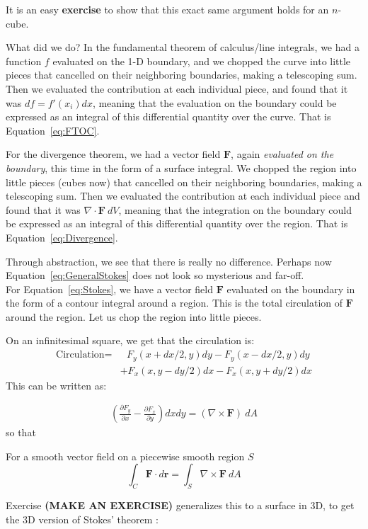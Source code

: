 	It is an easy \textbf{exercise} to show that this exact same argument holds for an $n$-cube. 
	
	What did we do? In the fundamental theorem of calculus/line integrals, we had a function $f$ evaluated on the 1-D boundary, and we chopped the curve into little pieces that cancelled on their neighboring boundaries, making a telescoping sum. Then we evaluated the contribution at each individual piece, and found that it was $df = f'(x_i) dx$, meaning that the evaluation on the boundary could be expressed as an integral of this differential quantity over the curve. That is Equation~\eqref{eq:FTOC}.
	
	For the divergence theorem, we had a vector field $\mathbf F$, again \emph{evaluated on the boundary}, this time in the form of a surface integral. We chopped the region into little pieces (cubes now) that cancelled on their neighboring boundaries, making a telescoping sum. Then we evaluated the contribution at each individual piece and found that it was $\nabla \cdot \mathbf F ~ dV$, meaning that the integration on the boundary could  be expressed as an integral of this differential quantity over the region. That is Equation~\eqref{eq:Divergence}.
	
	
	Through abstraction, we see that there is really no difference. Perhaps now Equation~\eqref{eq:GeneralStokes} does not look so mysterious and far-off.\\
	
	For Equation~\eqref{eq:Stokes}, we have a vector field $\mathbf F$ evaluated on the boundary in the form of a contour integral around a region. This is the total circulation of $\mathbf{F}$ around the region. Let us chop the region into little pieces. 
	
	
	On an infinitesimal square, we get that the circulation is:
	\begin{align*}
		\text{Circulation} =& ~~~  F_y (x+dx/2,y) dy - F_y (x-dx/2,y) dy \\ &+  F_x (x,y-dy/2) dx - F_x (x,y+dy/2) dx
	\end{align*}
	This can be written as:
	
	\begin{align*}
		\left( \frac{\partial F_y}{\partial x} - \frac{\partial F_x}{\partial y} \right) dx dy = (\nabla \times \mathbf F) ~ dA
	\end{align*}
	so that
	\begin{theorem} For a smooth vector field on a piecewise smooth region $S$ 
		\begin{equation}
			\int_C \mathbf{F} \cdot d\mathbf r = \int_S \nabla \times \mathbf{F} ~ dA
		\end{equation}
	\end{theorem}
	Exercise \textbf{(MAKE AN EXERCISE)} generalizes this to a surface in 3D, to get the 3D version of Stokes' theorem :
	
